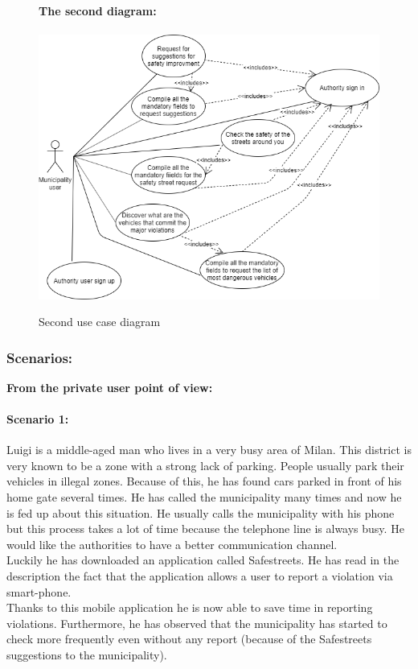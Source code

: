 \documentclass[titlepage]{article}
\begin{document}
\begin{figure}[h]
	\textbf{The second diagram:\\ \\ }
	\includegraphics[scale=0.465]{use case diagrams/use-case2.png}
	\centering
	\caption{Second use case diagram}
\end{figure}
\FloatBarrier

\subsubsection{Scenarios:}
\begin{center}
\textbf{From the private user point of view:}
\end{center}

\paragraph{Scenario 1:}Luigi is a middle-aged man who lives in a very busy area of Milan. This district is very known to be a zone with a strong lack of parking. People usually park their vehicles in illegal zones.
Because of this, he has found  cars parked in front of his home gate several times. He has called the municipality many times and now he is fed up about this situation. He usually calls the municipality with his phone but this process takes a lot of time because the telephone line is always busy. He would like the authorities to have a better communication channel.\\Luckily he has downloaded an application called Safestreets. He has read in the description the fact that the application allows a user to report a violation via smart-phone.\\
Thanks to this mobile application he is now able to save time in reporting violations. Furthermore, he has observed that  the municipality has started to check more frequently even without any report (because of the Safestreets suggestions to the municipality).
\end{document}
